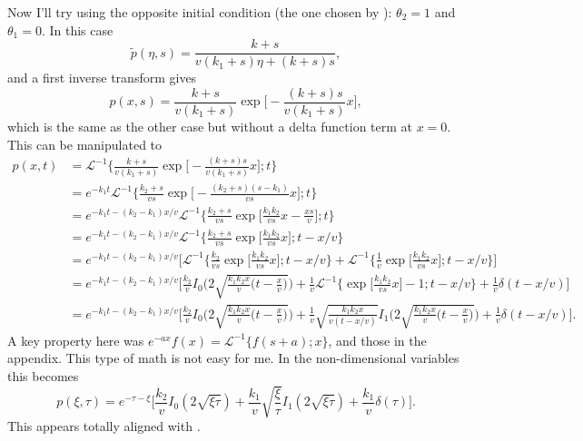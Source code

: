 \documentclass[11pt]{article}
\newcommand\be{\begin{equation}} %
\newcommand\ee{\end{equation}}   %
\newcommand\El{\mathcal{L}}
\begin{document}
Now I'll try using the opposite initial condition (the one chosen by \citet{Lisle1998}): $\theta_2 = 1$ and $\theta_1 = 0$.
In this case
\be \tilde{p}(\eta,s) = \frac{k+s}{v(k_1+s)\eta + (k+s)s},\ee
and a first inverse transform gives
\be p(x,s) = \frac{k+s}{v(k_1+s)} \exp\Big[-\frac{(k+s)s}{v(k_1+s)}x\Big],\ee
which is the same as the other case but without a delta function term at $x=0$.
This can be manipulated to 
\begin{align} p(x,t) &= \El^{-1} \Big\{ \frac{k+s}{v(k_1+s)} \exp\Big[-\frac{(k+s)s}{v(k_1+s)}x\Big] ; t\Big\} \\
&=  e^{-k_1 t}\El^{-1} \Big\{ \frac{k_2+s}{vs} \exp\Big[-\frac{(k_2+s)(s-k_1)}{vs}x\Big] ; t\Big\} \\
&= e^{-k_1 t -(k_2-k_1)x/v}\El^{-1} \Big\{ \frac{k_2+s}{vs} \exp\Big[\frac{k_1k_2}{vs}x - \frac{xs}{v}\Big] ; t\Big\}\\
&= e^{-k_1 t -(k_2-k_1)x/v}\El^{-1} \Big\{ \frac{k_2+s}{vs} \exp\Big[\frac{k_1k_2}{vs}x\Big] ; t-x/v\Big\} \\
&=  e^{-k_1 t -(k_2-k_1)x/v} \Big[ \El^{-1}  \Big\{ \frac{k_2}{vs} \exp\Big[\frac{k_1k_2}{vs}x\Big];t-x/v \Big\} + \El^{-1}  \Big\{ \frac{1}{v} \exp\Big[\frac{k_1k_2}{vs}x\Big];t-x/v \Big\} \Big] \\
&=  e^{-k_1 t -(k_2-k_1)x/v} \Big[\frac{k_2}{v} I_0\Big(2\sqrt{\frac{k_1k_2 x}{v}\big(t-\frac{x}{v}\big)}\Big) + \frac{1}{v}\El^{-1}\Big\{  \exp\Big[\frac{k_1k_2}{vs}x\Big] -1;t-x/v \Big\} + \frac{1}{v}\delta(t-x/v) \Big] \\ 
&=  e^{-k_1 t -(k_2-k_1)x/v} \Big[\frac{k_2}{v} I_0\Big(2\sqrt{\frac{k_1k_2 x}{v}\big(t-\frac{x}{v}\big)}\Big) + \frac{1}{v}\sqrt{\frac{k_1 k_2 x}{v (t-x/v)}}I_1\Big(2\sqrt{\frac{k_1k_2 x}{v}\big(t-\frac{x}{v}\big)}\Big) + \frac{1}{v}\delta(t-x/v) \Big].
\end{align}
A key property here was $e^{-ax}f(x) = \El^{-1}\{f(s+a);x\}$, and those in the appendix.
This type of math is not easy for me.
In the non-dimensional variables this becomes
\be p(\xi,\tau) = e^{-\tau-\xi}\Big[ \frac{k_2}{v} I_0(2\sqrt{\xi\tau}) + \frac{k_1}{v}\sqrt{\frac{\xi}{\tau}}I_1(2\sqrt{\xi\tau}) + \frac{k_1}{v} \delta(\tau)\Big].\ee
This appears totally aligned with \citet{Lisle1998}.
\end{document}
